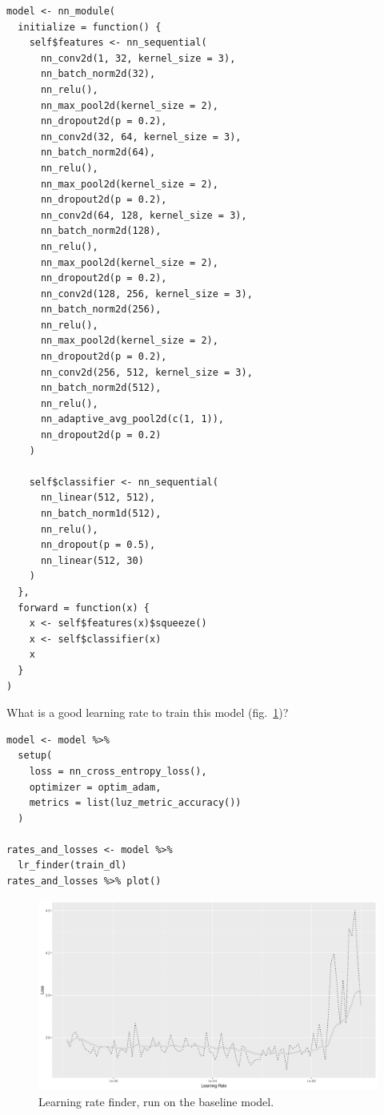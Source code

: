 \documentclass[
  letterpaper,
]{krantz}
\begin{document}
\begin{verbatim}
model <- nn_module(
  initialize = function() {
    self$features <- nn_sequential(
      nn_conv2d(1, 32, kernel_size = 3),
      nn_batch_norm2d(32),
      nn_relu(),
      nn_max_pool2d(kernel_size = 2),
      nn_dropout2d(p = 0.2),
      nn_conv2d(32, 64, kernel_size = 3),
      nn_batch_norm2d(64),
      nn_relu(),
      nn_max_pool2d(kernel_size = 2),
      nn_dropout2d(p = 0.2),
      nn_conv2d(64, 128, kernel_size = 3),
      nn_batch_norm2d(128),
      nn_relu(),
      nn_max_pool2d(kernel_size = 2),
      nn_dropout2d(p = 0.2),
      nn_conv2d(128, 256, kernel_size = 3),
      nn_batch_norm2d(256),
      nn_relu(),
      nn_max_pool2d(kernel_size = 2),
      nn_dropout2d(p = 0.2),
      nn_conv2d(256, 512, kernel_size = 3),
      nn_batch_norm2d(512),
      nn_relu(),
      nn_adaptive_avg_pool2d(c(1, 1)),
      nn_dropout2d(p = 0.2)
    )

    self$classifier <- nn_sequential(
      nn_linear(512, 512),
      nn_batch_norm1d(512),
      nn_relu(),
      nn_dropout(p = 0.5),
      nn_linear(512, 30)
    )
  },
  forward = function(x) {
    x <- self$features(x)$squeeze()
    x <- self$classifier(x)
    x
  }
)
\end{verbatim}

What is a good learning rate to train this model
(fig.~\ref{fig-audio-lr-finder-baseline})?

\begin{verbatim}
model <- model %>%
  setup(
    loss = nn_cross_entropy_loss(),
    optimizer = optim_adam,
    metrics = list(luz_metric_accuracy())
  )

rates_and_losses <- model %>%
  lr_finder(train_dl)
rates_and_losses %>% plot()
\end{verbatim}

\begin{figure}[H]

{\centering \includegraphics{images/audio-lr-finder-baseline.png}

}

\caption{\label{fig-audio-lr-finder-baseline}Learning rate finder, run
on the baseline model.}

\end{figure}
\end{document}
